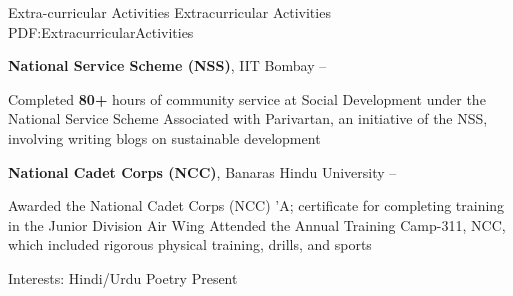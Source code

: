 \Section
{Extra\newline -curricular Activities}
{Extracurricular Activities}
{PDF:ExtracurricularActivities}

\Entry
{\bf National Service Scheme (NSS)}, IIT Bombay
\hfill
{} --
\begin{Detail}
\Item
Completed {\bf 80+} hours of community service at Social Development under the National Service Scheme
\Item
Associated with Parivartan, an initiative of the NSS, involving writing blogs on sustainable development
\end{Detail}

\Gap
\Entry
{\bf National Cadet Corps (NCC)}, Banaras Hindu University
\hfill
{} --
\begin{Detail}
\Item
Awarded the National Cadet Corps (NCC) 'A; certificate for completing training in the Junior Division Air Wing 
\Item
Attended the Annual Training Camp-311, NCC, which included rigorous physical training, drills, and sports
\end{Detail}

\Gap
\Entry
Interests: Hindi/Urdu Poetry
\hfill
Present